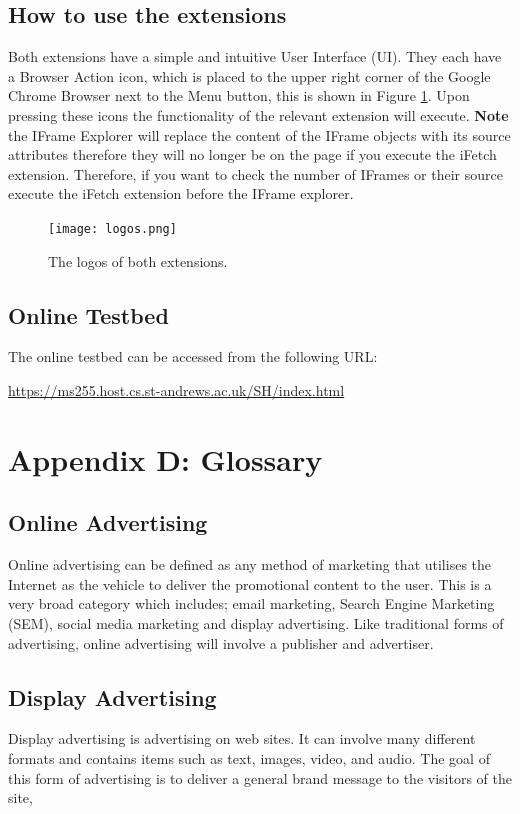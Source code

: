 \documentclass[12pt]{article}
\begin{document}
\subsection{How to use the extensions} \label{userGuide}
Both extensions have a simple and intuitive User Interface (UI). They each have a Browser Action icon, which is placed to the upper right corner of the Google Chrome Browser next to the Menu button, this is shown in Figure \ref{fig:logos}. Upon pressing these icons the functionality of the relevant extension will execute. \textbf{Note} the IFrame Explorer will replace the content of the IFrame objects with its source attributes therefore they will no longer be on the page if you execute the iFetch extension. Therefore, if you want to check the number of IFrames or their source execute the iFetch extension before the IFrame explorer.  

\begin{figure}[H]
    \centering
    \texttt{[image: logos.png]}
    \caption{The logos of both extensions.}
    \label{fig:logos}
\end{figure}

\subsection{Online Testbed}
The online testbed can be accessed from the following URL: 
\begin{center}
\url{https://ms255.host.cs.st-andrews.ac.uk/SH/index.html}
\end{center}

\section{Appendix D: Glossary} \label{glossary}

\subsection{Online Advertising}
Online advertising can be defined as any method of marketing that utilises the Internet as the vehicle to deliver the promotional content to the user. This is a very broad category which includes; email marketing, Search Engine Marketing (SEM), social media marketing and display advertising. Like traditional forms of advertising, online advertising will involve a publisher and advertiser. 

\subsection{Display Advertising}
Display advertising is advertising on web sites. It can involve many different formats and contains items such as text, images, video, and audio. The goal of this form of advertising is to deliver a general brand message to the visitors of the site,
\end{document}
